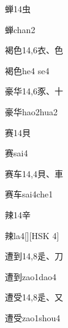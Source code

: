 \begin{entry}{蝉}{14}{⾍}
  \begin{phonetics}{蝉}{chan2}
  \end{phonetics}
\end{entry}

\begin{entry}{褐色}{14,6}{⾐、⾊}
  \begin{phonetics}{褐色}{he4 se4}
  \end{phonetics}
\end{entry}

\begin{entry}{豪华}{14,6}{⾗、⼗}
  \begin{phonetics}{豪华}{hao2hua2}
  \end{phonetics}
\end{entry}

\begin{entry}{赛}{14}{⾙}
  \begin{phonetics}{赛}{sai4}
  \end{phonetics}
\end{entry}

\begin{entry}{赛车}{14,4}{⾙、⾞}
  \begin{phonetics}{赛车}{sai4che1}
  \end{phonetics}
\end{entry}

\begin{entry}{辣}{14}{⾟}
  \begin{phonetics}{辣}{la4}[][HSK 4]
  \end{phonetics}
\end{entry}

\begin{entry}{遭到}{14,8}{⾡、⼑}
  \begin{phonetics}{遭到}{zao1dao4}
  \end{phonetics}
\end{entry}

\begin{entry}{遭受}{14,8}{⾡、⼜}
  \begin{phonetics}{遭受}{zao1shou4}
  \end{phonetics}
\end{entry}

